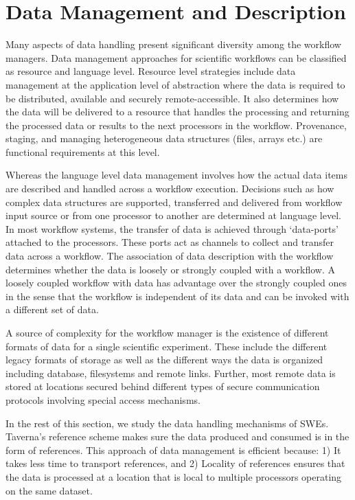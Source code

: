 \section{Data Management and Description} \label{sec:data}
Many aspects of data handling present significant diversity among the workflow
managers. Data management approaches for scientific workflows can be classified
as resource and language level. Resource level strategies include data
management at the application level of abstraction where the data is required
to be distributed, available and securely remote-accessible. It also determines
how the data will be delivered to a resource that handles the processing and
returning the processed data or results to the next processors in the workflow.
Provenance, staging, and managing heterogeneous data structures (files, arrays
etc.) are functional requirements at this level.

Whereas the language level data management involves how the actual data items
are described and handled across a workflow execution. Decisions such as how
complex data structures are supported, transferred and delivered from workflow
input source or from one processor to another are determined at language level.
In most workflow systems, the transfer of data is achieved through `data-ports'
attached to the processors. These ports act as channels to collect and transfer
data across a workflow. The association of data description with the workflow
determines whether the data is loosely or strongly coupled with a workflow. A
loosely coupled workflow with data has advantage over the strongly coupled ones
in the sense that the workflow is independent of its data and can be invoked
with a different set of data.

A source of complexity for the workflow manager is the existence of different
formats of data for a single scientific experiment. These include the different
legacy formats of storage as well as the different ways the data is organized
including database, filesystems and remote links. Further, most remote data is
stored at locations secured behind different types of secure communication
protocols involving special access mechanisms.

In the rest of this section, we study the data handling mechanisms of SWEs.
Taverna's reference scheme makes sure the data produced and consumed is in the
form of references. This approach of data management is efficient because: 1)
It takes less time to transport references, and 2) Locality of references
ensures that the data is processed at a location that is local to multiple
processors operating on the same dataset.

